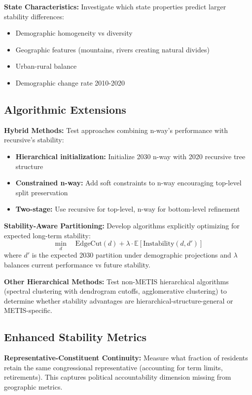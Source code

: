 \textbf{State Characteristics:} Investigate which state properties predict larger stability differences:
\begin{itemize}
    \item Demographic homogeneity vs diversity
    \item Geographic features (mountains, rivers creating natural divides)
    \item Urban-rural balance
    \item Demographic change rate 2010-2020
\end{itemize}

\subsection{Algorithmic Extensions}

\textbf{Hybrid Methods:} Test approaches combining n-way's performance with recursive's stability:
\begin{itemize}
    \item \textbf{Hierarchical initialization:} Initialize 2030 n-way with 2020 recursive tree structure
    \item \textbf{Constrained n-way:} Add soft constraints to n-way encouraging top-level split preservation
    \item \textbf{Two-stage:} Use recursive for top-level, n-way for bottom-level refinement
\end{itemize}

\textbf{Stability-Aware Partitioning:} Develop algorithms explicitly optimizing for expected long-term stability:
$$\min_{d} \quad \text{EdgeCut}(d) + \lambda \cdot \mathbb{E}[\text{Instability}(d, d')]$$
where $d'$ is the expected 2030 partition under demographic projections and $\lambda$ balances current performance vs future stability.

\textbf{Other Hierarchical Methods:} Test non-METIS hierarchical algorithms (spectral clustering with dendrogram cutoffs, agglomerative clustering) to determine whether stability advantages are hierarchical-structure-general or METIS-specific.

\subsection{Enhanced Stability Metrics}

\textbf{Representative-Constituent Continuity:} Measure what fraction of residents retain the same congressional representative (accounting for term limits, retirements). This captures political accountability dimension missing from geographic metrics.

